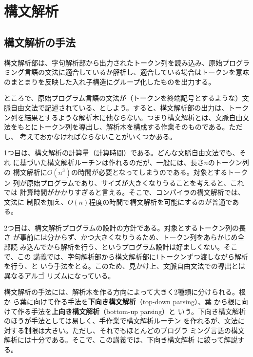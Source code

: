 
\newcommand{\First}{{\sf FIRST}}
\newcommand{\Follow}{{\sf FOLLOW}}
\newcommand{\Director}{{\sf DIRECTOR}}

\chapter{構文解析}

\section{構文解析の手法}

構文解析部は、字句解析部から出力されたトークン列を読み込み、原始プログラ
ミング言語の文法に適合しているか解析し、適合している場合はトークンを意味
のまとまりを反映した入れ子構造にグループ化したものを出力する。

ところで、原始プログラム言語の文法が（トークンを終端記号とするような）文
脈自由文法で記述されている、としよう。すると、構文解析部の出力は、トーク
ン列を結果とするような解析木に他ならない。つまり構文解析とは、文脈自由文
法をもとにトークン列を導出し、解析木を構成する作業そのものである。ただし、
考えておかなければならないことがいくつかある。

1つ目は、構文解析の計算量（計算時間）である。どんな文脈自由文法でも、それ
に基づいた構文解析ルーチンは作れるのだが、一般には、長さ$n$のトークン列の
構文解析に$O(n^3)$の時間が必要となってしまうのである。対象とするトークン
列が原始プログラムであり、サイズが大きくなりうることを考えると、これでは
計算時間がかかりすぎると言える。そこで、コンパイラの構文解析では、文法に
制限を加え、$O(n)$程度の時間で構文解析を可能にするのが普通である。

2つ目は、構文解析プログラムの設計の方針である。対象とするトークン列の長さ
が事前には分からず、かつ大きくなりうるため、トークン列をあらかじめ全部読
み込んでから解析を行う、というプログラム設計は好ましくない。そこで、この
講義では、字句解析部から構文解析部に1トークンずつ渡しながら解析を行う、と
いう手法をとる。このため、見かけ上、文脈自由文法での導出とは異なるアルゴ
リズムになっている。

構文解析の手法には、解析木を作る方向によって大きく2種類に分けられる。根か
ら葉に向けて作る手法を{\bfseries 下向き構文解析}（top-down parsing）、葉
から根に向けて作る手法を{\bfseries 上向き構文解析}（bottom-up parsing）と
いう。下向き構文解析のほうが手法としては易しく、手作業で構文解析ルーチン
を作れるが、文法に対する制限は大きい。ただし、それでもほとんどのプログラ
ミング言語の構文解析には十分である。そこで、この講義では、下向き構文解析
に絞って解説する。

